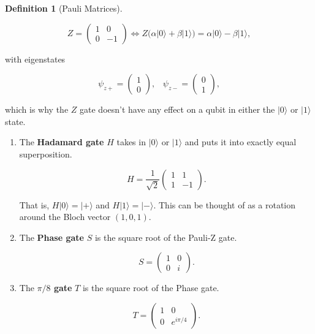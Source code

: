 \documentclass{article}
\theoremstyle{definition}
\newtheorem{definition}{Definition}[section]
\begin{document}
\begin{definition}[Pauli Matrices]
\begin{enumerate}
              \[Z = \begin{pmatrix} 1 & 0 \\ 0 & -1 \end{pmatrix} \iff Z \big( \alpha |0\rangle + \beta | 1 \rangle \big) = \alpha |0 \rangle - \beta |1 \rangle,\]

            with eigenstates

              \[\psi_{z+} = \begin{pmatrix} 1 \\ 0 \end{pmatrix}, \;\;\; \psi_{z-} = \begin{pmatrix} 0 \\ 1 \end{pmatrix},\]

            which is why the $Z$ gate doesn't have any effect on a qubit in either the $|0\rangle$ or $|1\rangle$ state.
        \end{enumerate}
      \end{definition}

      \begin{enumerate}
        \item The \textbf{Hadamard gate} $H$ takes in $|0\rangle$ or $|1\rangle$ and puts it into exactly equal superposition.

          \[H = \frac{1}{\sqrt{2}} \begin{pmatrix} 1 & 1 \\ 1 & -1 \end{pmatrix}.\]

        That is, $H|0\rangle = |+\rangle$ and $H|1\rangle = |-\rangle$. This can be thought of as a rotation around the Bloch vector $(1, 0, 1)$.

        \item The \textbf{Phase gate} $S$ is the square root of the Pauli-Z gate.

          \[S = \begin{pmatrix} 1 & 0 \\ 0 & i \end{pmatrix}.\]

        \item The \textbf{$\pi/8$ gate} $T$ is the square root of the Phase gate.

          \[T = \begin{pmatrix} 1 & 0 \\ 0 & e^{i \pi/4} \end{pmatrix}.\]
      \end{enumerate}
\end{document}
